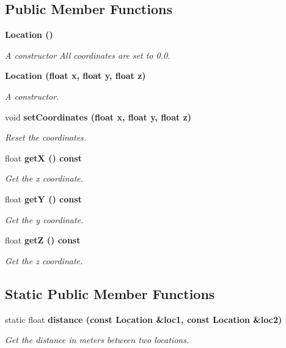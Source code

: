 \subsection*{Public Member Functions}
\begin{CompactItemize}
\item 
\bf{Location} ()\label{classLocation_87790c14997fd8cdd12080c78c9794bb}

\begin{CompactList}\small\item\em A constructor All coordinates are set to 0.0. \item\end{CompactList}\item 
\bf{Location} (float x, float y, float z)
\begin{CompactList}\small\item\em A constructor. \item\end{CompactList}\item 
void \bf{set\-Coordinates} (float x, float y, float z)
\begin{CompactList}\small\item\em Reset the coordinates. \item\end{CompactList}\item 
float \bf{get\-X} () const 
\begin{CompactList}\small\item\em Get the x coordinate. \item\end{CompactList}\item 
float \bf{get\-Y} () const 
\begin{CompactList}\small\item\em Get the y coordinate. \item\end{CompactList}\item 
float \bf{get\-Z} () const 
\begin{CompactList}\small\item\em Get the z coordinate. \item\end{CompactList}\end{CompactItemize}
\subsection*{Static Public Member Functions}
\begin{CompactItemize}
\item 
static float \bf{distance} (const \bf{Location} \&loc1, const \bf{Location} \&loc2)
\begin{CompactList}\small\item\em Get the distance in meters between two locations. \item\end{CompactList}\end{CompactItemize}


